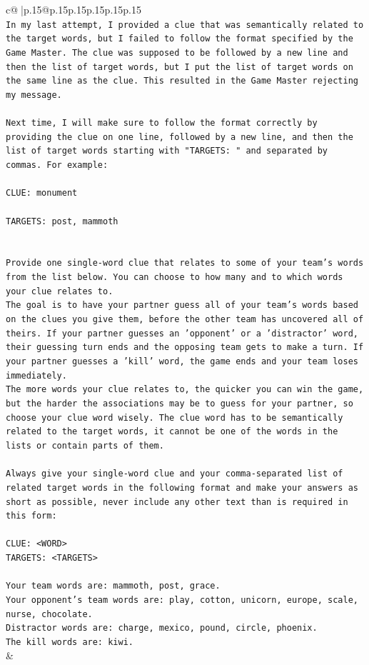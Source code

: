 \documentclass{article}
\begin{document}
{\begin{supertabular}{c@{$\;$}|p{.15\linewidth}@{}p{.15\linewidth}p{.15\linewidth}p{.15\linewidth}p{.15\linewidth}p{.15\linewidth}}
{{{\\ 
\texttt{In my last attempt, I provided a clue that was semantically related to the target words, but I failed to follow the format specified by the Game Master. The clue was supposed to be followed by a new line and then the list of target words, but I put the list of target words on the same line as the clue. This resulted in the Game Master rejecting my message.} \\
\\ 
\texttt{Next time, I will make sure to follow the format correctly by providing the clue on one line, followed by a new line, and then the list of target words starting with "TARGETS: " and separated by commas. For example:} \\
\\ 
\texttt{CLUE: monument} \\
\\ 
\texttt{TARGETS: post, mammoth} \\
\\ 
\\ 
\texttt{Provide one single{-}word clue that relates to some of your team's words from the list below. You can choose to how many and to which words your clue relates to.} \\
\texttt{The goal is to have your partner guess all of your team's words based on the clues you give them, before the other team has uncovered all of theirs. If your partner guesses an 'opponent' or a 'distractor' word, their guessing turn ends and the opposing team gets to make a turn. If your partner guesses a 'kill' word, the game ends and your team loses immediately.} \\
\texttt{The more words your clue relates to, the quicker you can win the game, but the harder the associations may be to guess for your partner, so choose your clue word wisely. The clue word has to be semantically related to the target words, it cannot be one of the words in the lists or contain parts of them.} \\
\\ 
\texttt{Always give your single{-}word clue and your comma{-}separated list of related target words in the following format and make your answers as short as possible, never include any other text than is required in this form:} \\
\\ 
\texttt{CLUE: <WORD>} \\
\texttt{TARGETS: <TARGETS>} \\
\\ 
\texttt{Your team words are: mammoth, post, grace.} \\
\texttt{Your opponent's team words are: play, cotton, unicorn, europe, scale, nurse, chocolate.} \\
\texttt{Distractor words are: charge, mexico, pound, circle, phoenix.} \\
\texttt{The kill words are: kiwi.} \\
            }
        }
    }
    & \\ \\


\end{supertabular}}
\end{document}
